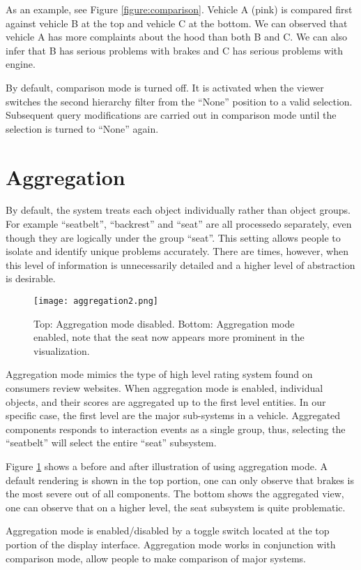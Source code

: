 As an example, see Figure \ref{figure:comparison}. Vehicle A (pink) is compared
first against vehicle B at the top and vehicle C at the bottom. We can observed
that vehicle A has more complaints about the hood than both B and C. We can also
infer that B has serious problems with brakes and C has serious problems with
engine.
 
By default, comparison mode is turned off. It is activated when the viewer
switches the second hierarchy filter from the ``None'' position to a valid
selection. Subsequent query modifications are carried out in comparison mode
until the selection is turned to ``None'' again.


 
 
 
\section{Aggregation}
By default, the system treats each object individually rather than object
groups. For example ``seatbelt'', ``backrest'' and ``seat'' are all processedo
separately, even though they are logically under the group ``seat''. This
setting allows people to isolate and identify unique problems accurately. There
are times, however, when this level of information is unnecessarily detailed and
a higher level of abstraction is desirable.

	\begin{figure}
	 \centering  
	 \texttt{[image: aggregation2.png]}
	 \caption[Aggregation View]{Top: Aggregation mode disabled. Bottom: Aggregation
	 mode enabled, note that the seat now appears more prominent in the visualization.}
	 \label{figure:aggregation}
	\end{figure}
	
Aggregation mode mimics the type of high level rating system found on consumers
review websites. When aggregation mode is enabled, individual objects, and their
scores are aggregated up to the first level entities. In our specific case, the 
first level are the major sub-systems in a vehicle. Aggregated components
responds to interaction events as a single group, thus, selecting the
``seatbelt'' will select the entire ``seat'' subsystem.

 
Figure \ref{figure:aggregation} shows a before and after illustration of using
aggregation mode. A default rendering is shown in the top portion, one can
only observe that brakes is the most severe out of all components. The bottom
shows the aggregated view, one can observe that on a higher level, the seat
subsystem is quite problematic.
 
Aggregation mode is enabled/disabled by a toggle switch located at the top
portion of the display interface. Aggregation mode works in
conjunction with comparison mode, allow people to make comparison of major
systems.
